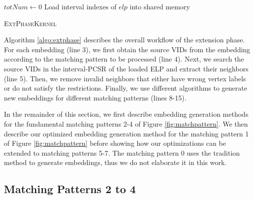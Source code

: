 \begin{algorithm}[t]
 $totNum \leftarrow 0$\; Load interval indexes of $elp$ into shared memory\; 

\caption{\textsc{ExtPhaseKernel}} \label{algo:extphase}
\end{algorithm}



Algorithm \ref{algo:extphase} describes the overall workflow of the \SystemName extension phase. For each embedding (line 3), we first
obtain the source VIDs from the embedding according to the matching pattern to be processed (line 4). Next, we search the source VIDs in
the \SystemName interval-PCSR of the loaded ELP and extract their neighbors (line 5).  Then, we remove invalid neighbors that either have wrong
vertex labels or do not satisfy the restrictions. Finally, we use different algorithms to generate new
embeddings for different matching patterns (lines 8-15).

In the remainder of this section, we first describe embedding generation methods for the fundamental matching patterns 2-4 of Figure
\ref{fig:matchpattern}. We then describe our optimized embedding generation method for the matching pattern 1 of Figure \ref{fig:matchpattern} before showing how our optimizations can be extended to matching patterns 5-7. The matching pattern 0 uses the tradition method to generate embeddings, thus we do not elaborate it in this work.

\subsection{Matching Patterns 2 to 4}

